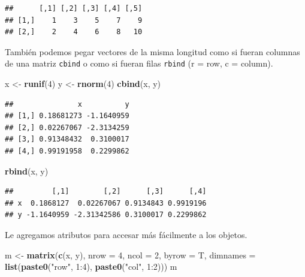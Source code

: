 \documentclass[]{article}
\newenvironment{Shaded}{\begin{snugshade}}{\end{snugshade}}
\newcommand{\KeywordTok}[1]{\textcolor[rgb]{0.13,0.29,0.53}{\textbf{{#1}}}}
\newcommand{\DataTypeTok}[1]{\textcolor[rgb]{0.13,0.29,0.53}{{#1}}}
\newcommand{\DecValTok}[1]{\textcolor[rgb]{0.00,0.00,0.81}{{#1}}}
\newcommand{\StringTok}[1]{\textcolor[rgb]{0.31,0.60,0.02}{{#1}}}
\newcommand{\NormalTok}[1]{{#1}}
\begin{document}
\begin{verbatim}
##      [,1] [,2] [,3] [,4] [,5]
## [1,]    1    3    5    7    9
## [2,]    2    4    6    8   10
\end{verbatim}

También podemos pegar vectores de la misma longitud como si fueran
columnas de una matriz \texttt{cbind} o como si fueran filas
\texttt{rbind} (r = row, c = column).

\begin{Shaded}
\begin{Highlighting}[]
\NormalTok{x <-}\StringTok{ }\KeywordTok{runif}\NormalTok{(}\DecValTok{4}\NormalTok{)}
\NormalTok{y <-}\StringTok{ }\KeywordTok{rnorm}\NormalTok{(}\DecValTok{4}\NormalTok{)}
\KeywordTok{cbind}\NormalTok{(x, y)}
\end{Highlighting}
\end{Shaded}

\begin{verbatim}
##               x          y
## [1,] 0.18681273 -1.1640959
## [2,] 0.02267067 -2.3134259
## [3,] 0.91348432  0.3100017
## [4,] 0.99191958  0.2299862
\end{verbatim}

\begin{Shaded}
\begin{Highlighting}[]
\KeywordTok{rbind}\NormalTok{(x, y)}
\end{Highlighting}
\end{Shaded}

\begin{verbatim}
##         [,1]        [,2]      [,3]      [,4]
## x  0.1868127  0.02267067 0.9134843 0.9919196
## y -1.1640959 -2.31342586 0.3100017 0.2299862
\end{verbatim}

Le agregamos atributos para accesar más fácilmente a los objetos.

\begin{Shaded}
\begin{Highlighting}[]
\NormalTok{m <-}\StringTok{ }\KeywordTok{matrix}\NormalTok{(}\KeywordTok{c}\NormalTok{(x, y), }\DataTypeTok{nrow =} \DecValTok{4}\NormalTok{, }\DataTypeTok{ncol =} \DecValTok{2}\NormalTok{, }\DataTypeTok{byrow =} \NormalTok{T,}
            \DataTypeTok{dimnames =} \KeywordTok{list}\NormalTok{(}\KeywordTok{paste0}\NormalTok{(}\StringTok{"row"}\NormalTok{, }\DecValTok{1}\NormalTok{:}\DecValTok{4}\NormalTok{),}
                            \KeywordTok{paste0}\NormalTok{(}\StringTok{"col"}\NormalTok{, }\DecValTok{1}\NormalTok{:}\DecValTok{2}\NormalTok{)))}
\NormalTok{m}
\end{Highlighting}
\end{Shaded}
\end{document}
